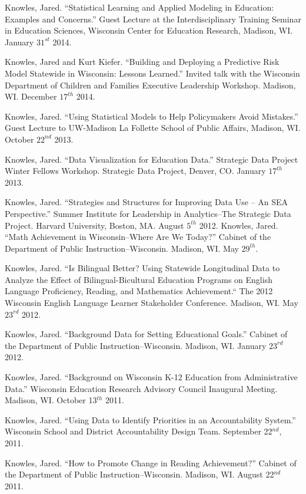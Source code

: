 \documentclass[margin,line]{res}
\begin{document}
\begin{resume}
Knowles, Jared. ``Statistical Learning and Applied Modeling in Education: Examples 
and Concerns.'' Guest Lecture at the Interdisciplinary Training Seminar in Education Sciences, Wisconsin Center for Education Research, Madison, WI. January $31^{st}$ 2014.

Knowles, Jared and Kurt Kiefer. ``Building and Deploying a Predictive Risk Model Statewide in Wisconsin: Lessons Learned.'' Invited talk with the 
Wisconsin Department of Children and Families Executive Leadership Workshop. Madison, WI. December $17^{th}$ 2014.

Knowles, Jared. ``Using Statistical Models to Help Policymakers Avoid Mistakes.'' Guest Lecture to UW-Madison La Follette School of Public Affairs, Madison, WI. October $22^{nd}$ 2013.

Knowles, Jared. ``Data Visualization for Education Data.'' Strategic Data Project Winter Fellows Workshop. Strategic Data Project, Denver, CO. January $17^{th}$ 2013. 

Knowles, Jared. ``Strategies and Structures for Improving Data Use -- An SEA Perspective.'' Summer Institute for Leadership in Analytics--The Strategic Data Project. Harvard University, Boston, MA. August $5^{th}$ 2012. 
Knowles, Jared. ``Math Achievement in Wisconsin--Where Are We Today?'' Cabinet of the Department of Public Instruction--Wisconsin. Madison, WI. May $29^{th}$. 


Knowles, Jared. ``Is Bilingual Better? Using Statewide Longitudinal Data to Analyze the Effect of Bilingual-Bicultural Education Programs on English Language Proficiency, Reading, and Mathematics Achievement.`` The 2012 Wisconsin English Language Learner Stakeholder Conference. Madison, WI. May $23^{rd}$ 2012.

Knowles, Jared. ``Background Data for Setting Educational Goals.'' Cabinet of the Department of Public Instruction--Wisconsin. Madison, WI. January $23^{rd}$ 2012.

Knowles, Jared. ``Background on Wisconsin K-12 Education from Administrative Data.'' Wisconsin Education Research Advisory Council Inaugural Meeting. Madison, WI. October 13$^{th}$ 2011.

Knowles, Jared. ``Using Data to Identify Priorities in an Accountability System.'' Wisconsin School and District Accountability Design Team. September 22$^{nd}$, 2011.

Knowles, Jared. ``How to Promote Change in Reading Achievement?'' Cabinet of the Department of Public Instruction--Wisconsin. Madison, WI. August 22$^{nd}$ 2011.


\end{resume}
\end{document}
